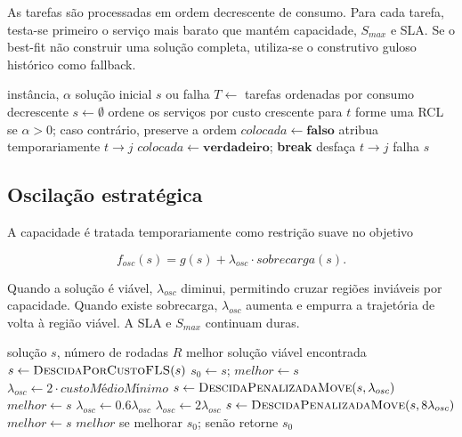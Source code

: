 \documentclass{article}
\begin{document}
As tarefas são processadas em ordem decrescente de consumo. Para cada tarefa,
testa-se primeiro o serviço mais barato que mantém capacidade, $S_{max}$ e SLA.
Se o best-fit não construir uma solução completa, utiliza-se o construtivo
guloso histórico como fallback.

\begin{algorithm}[H]
\caption{Construtivo Best-Fit Cheapest-Feasible}
\begin{algorithmic}[1]
\Require instância, $\alpha$
\Ensure solução inicial $s$ ou falha
\State $T\gets$ tarefas ordenadas por consumo decrescente
\State $s\gets\emptyset$
    \State ordene os serviços por custo crescente para $t$
    \State forme uma RCL se $\alpha>0$; caso contrário, preserve a ordem
    \State $colocada\gets\textbf{falso}$
        \State atribua temporariamente $t\rightarrow j$
            \State $colocada\gets\textbf{verdadeiro}$; \textbf{break}
        \Else
            \State desfaça $t\rightarrow j$
        \EndIf
    \EndFor
     \State \Return falha \EndIf
\EndFor
\State \Return $s$
\end{algorithmic}
\end{algorithm}

\subsection{Oscilação estratégica}

A capacidade é tratada temporariamente como restrição suave no objetivo

\begin{equation}
    f_{osc}(s)=g(s)+\lambda_{osc}\cdot sobrecarga(s).
\end{equation}

Quando a solução é viável, $\lambda_{osc}$ diminui, permitindo cruzar regiões
inviáveis por capacidade. Quando existe sobrecarga, $\lambda_{osc}$ aumenta e
empurra a trajetória de volta à região viável. A SLA e $S_{max}$ continuam
duras.

\begin{algorithm}[H]
\caption{Busca Local Híbrida}
\begin{algorithmic}[1]
\Require solução $s$, número de rodadas $R$
\Ensure melhor solução viável encontrada
\State $s\gets\Call{DescidaPorCustoFLS}{s}$
\State $s_0\gets s$; $melhor\gets s$
\State $\lambda_{osc}\gets 2\cdot custoMédioMínimo$
    \State $s\gets\Call{DescidaPenalizadaMove}{s,\lambda_{osc}}$
         \State $melhor\gets s$ \EndIf
        \State $\lambda_{osc}\gets0.6\lambda_{osc}$
    \Else
        \State $\lambda_{osc}\gets2\lambda_{osc}$
    \EndIf
\EndFor
\State $s\gets\Call{DescidaPenalizadaMove}{s,8\lambda_{osc}}$
    \State $melhor\gets s$
\EndIf
\State \Return $melhor$ se melhorar $s_0$; senão retorne $s_0$
\end{algorithmic}
\end{algorithm}
\end{document}
